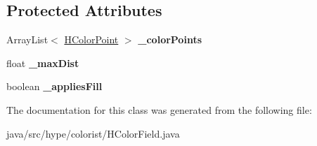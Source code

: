 \subsection*{Protected Attributes}
\begin{DoxyCompactItemize}
\item 
\hypertarget{classhype_1_1colorist_1_1_h_color_field_a3405873de28ef44d2f8bce4770202048}{Array\-List$<$ \hyperlink{classhype_1_1colorist_1_1_h_color_field_1_1_h_color_point}{H\-Color\-Point} $>$ {\bfseries \-\_\-color\-Points}}\label{classhype_1_1colorist_1_1_h_color_field_a3405873de28ef44d2f8bce4770202048}

\item 
\hypertarget{classhype_1_1colorist_1_1_h_color_field_a49741a866fdcc404a396cb387d04b7eb}{float {\bfseries \-\_\-max\-Dist}}\label{classhype_1_1colorist_1_1_h_color_field_a49741a866fdcc404a396cb387d04b7eb}

\item 
\hypertarget{classhype_1_1colorist_1_1_h_color_field_ade8032b9b41ab7a1d2cd62b43c890167}{boolean {\bfseries \-\_\-applies\-Fill}}\label{classhype_1_1colorist_1_1_h_color_field_ade8032b9b41ab7a1d2cd62b43c890167}

\end{DoxyCompactItemize}


The documentation for this class was generated from the following file\-:\begin{DoxyCompactItemize}
\item 
java/src/hype/colorist/H\-Color\-Field.\-java\end{DoxyCompactItemize}
